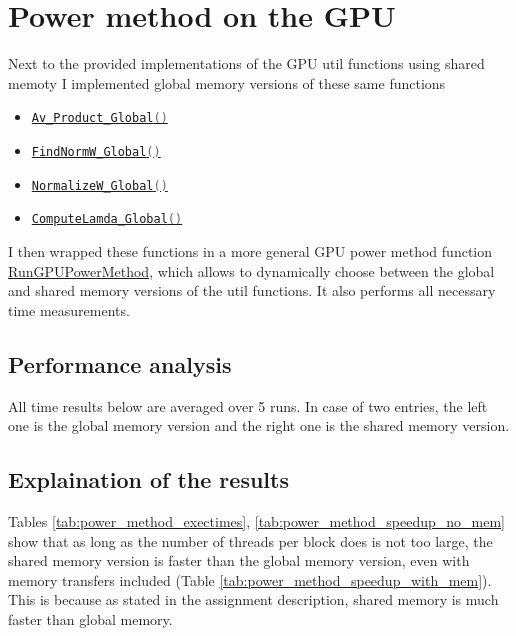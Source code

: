 \section{Power method on the GPU}
Next to the provided implementations of the GPU util functions using shared memoty I implemented 
global memory versions of these same functions
\begin{itemize}
    \item 
        \href{https://github.com/PhilipSoliman/hpc-labs/blob/eaa6eae4b21eae73d1903c3859017a9312980d10/assignment_3/powermethod.cu#L634C17-L648}
        {\lstinline[language=C]{Av_Product_Global()}}
    \item 
        \href{https://github.com/PhilipSoliman/hpc-labs/blob/eaa6eae4b21eae73d1903c3859017a9312980d10/assignment_3/powermethod.cu#L650-L664}
        {\lstinline[language=C]{FindNormW_Global()}}
    \item 
        \href{https://github.com/PhilipSoliman/hpc-labs/blob/eaa6eae4b21eae73d1903c3859017a9312980d10/assignment_3/powermethod.cu#L666-L675}
        {\lstinline[language=C]{NormalizeW_Global()}}
    \item 
        \href{https://github.com/PhilipSoliman/hpc-labs/blob/eaa6eae4b21eae73d1903c3859017a9312980d10/assignment_3/powermethod.cu#L677-L690}
        {\lstinline[language=C]{ComputeLamda_Global()}}
\end{itemize}
I then wrapped these functions in a more general GPU power method function 
\href{https://github.com/PhilipSoliman/hpc-labs/blob/eaa6eae4b21eae73d1903c3859017a9312980d10/assignment_3/powermethod.cu#L121C6-L121C23}
{RunGPUPowerMethod}, which allows to dynamically choose between the global and shared memory versions of the util functions. 
It also performs all necessary time measurements.

\subsection{Performance analysis} 
All time results below are averaged over 5 runs. In case of two entries, the left one
is the global memory version and the right one is the shared memory version.






\subsection{Explaination of the results}
Tables \ref{tab:power_method_exectimes}, \ref{tab:power_method_speedup_no_mem} show that as long as
the number of threads per block does is not too large, the shared memory version is faster than the global memory version,
even with memory transfers included (Table \ref{tab:power_method_speedup_with_mem}). This is because as stated in the 
assignment description, shared memory is much faster than global memory. 

